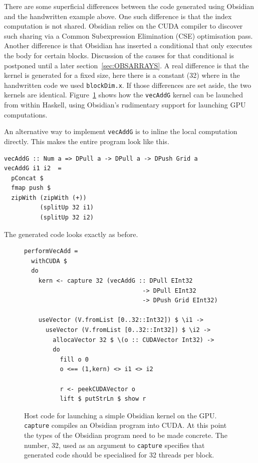 \documentclass[a4paper]{book}
\begin{document}
There are some superficial differences between the code generated using Obsidian and the 
handwritten example above. One such difference is that the index computation is not shared. 
Obsidian relies on the CUDA compiler to discover such sharing via a Common Subexpression 
Elimination (CSE) optimisation pass. Another difference is that Obsidian has inserted a 
conditional that only executes the body for certain blocks. Discussion of the causes for 
that conditional is postponed until a later section~\ref{sec:OBSARRAYS}. A real 
difference is that the kernel is generated for a fixed size, here there is a constant (32) 
where in the handwritten code we used {\tt blockDim.x}. If those differences are set 
aside, the two kernels are identical. Figure~\ref{fig:OBSIDIANHOST1} shows how the 
{\tt vecAddG} kernel can be launched from within Haskell, using Obsidian's rudimentary 
support for launching GPU computations. 

An alternative way to implement {\tt vecAddG} is to inline the local computation 
directly. This makes the entire program look like this. 

\begin{small}
\begin{Verbatim}[samepage=true]
vecAddG :: Num a => DPull a -> DPull a -> DPush Grid a
vecAddG i1 i2  =
  pConcat $
  fmap push $
  zipWith (zipWith (+)) 
          (splitUp 32 i1)
          (splitUp 32 i2)
\end{Verbatim} 
\end{small} 

\noindent The generated code looks exactly as before. 


\begin{figure} 
\begin{small}
\begin{Verbatim}[samepage=true]
performVecAdd =
  withCUDA $
  do
    kern <- capture 32 (vecAddG :: DPull EInt32
                                 -> DPull EInt32
                                 -> DPush Grid EInt32)

    useVector (V.fromList [0..32::Int32]) $ \i1 ->
      useVector (V.fromList [0..32::Int32]) $ \i2 -> 
        allocaVector 32 $ \(o :: CUDAVector Int32) ->
        do
          fill o 0
          o <== (1,kern) <> i1 <> i2 

          r <- peekCUDAVector o
          lift $ putStrLn $ show r
\end{Verbatim} 
\end{small}

\caption{Host code for launching a simple Obsidian kernel on the GPU. \\ 
 {\tt capture} compiles an Obsidian program into CUDA. At this point the 
  types of the Obsidian program need to be made concrete. The number, 32, used as 
 an argument to {\tt capture} specifies that generated code should be specialised 
 for 32 threads per block. }
\label{fig:OBSIDIANHOST1}
\end{figure} 
\end{document}
